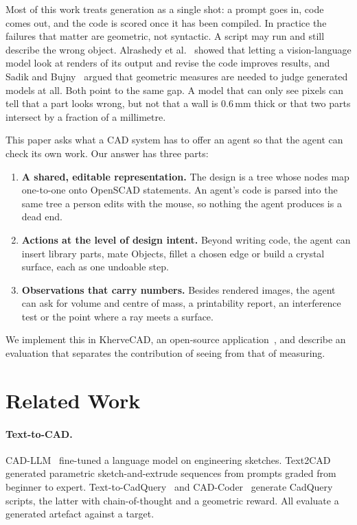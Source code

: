 \documentclass[lineno]{asmejour}
\begin{document}
Most of this work treats generation as a single shot: a prompt goes in, code comes out, and the code is scored once it has been compiled. In practice the failures that matter are geometric, not syntactic. A script may run and still describe the wrong object. Alrashedy et al.~\cite{alrashedy2025cadcodeverify} showed that letting a vision-language model look at renders of its output and revise the code improves results, and Sadik and Bujny~\cite{sadik2025hitl} argued that geometric measures are needed to judge generated models at all. Both point to the same gap. A model that can only see pixels can tell that a part looks wrong, but not that a wall is 0.6\,mm thick or that two parts intersect by a fraction of a millimetre.

This paper asks what a CAD system has to offer an agent so that the agent can check its own work. Our answer has three parts:
\begin{enumerate}
\item \textbf{A shared, editable representation.} The design is a tree whose nodes map one-to-one onto OpenSCAD statements. An agent's code is parsed into the same tree a person edits with the mouse, so nothing the agent produces is a dead end.
\item \textbf{Actions at the level of design intent.} Beyond writing code, the agent can insert library parts, mate Objects, fillet a chosen edge or build a crystal surface, each as one undoable step.
\item \textbf{Observations that carry numbers.} Besides rendered images, the agent can ask for volume and centre of mass, a printability report, an interference test or the point where a ray meets a surface.
\end{enumerate}
We implement this in KherveCAD, an open-source application~\cite{kherveCADzenodo}, and describe an evaluation that separates the contribution of seeing from that of measuring.

\section{Related Work}

\paragraph{Text-to-CAD.} CAD-LLM~\cite{wu2023cadllm} fine-tuned a language model on engineering sketches. Text2CAD~\cite{khan2024text2cad} generated parametric sketch-and-extrude sequences from prompts graded from beginner to expert. Text-to-CadQuery~\cite{xie2025textcadquery} and CAD-Coder~\cite{guan2025cadcoder} generate CadQuery scripts, the latter with chain-of-thought and a geometric reward. All evaluate a generated artefact against a target.
\end{document}
